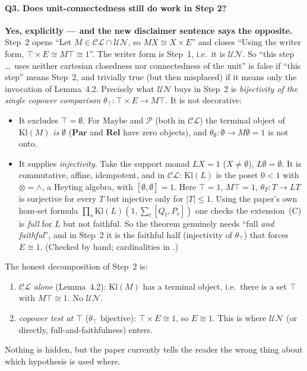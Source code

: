 \documentclass[11pt]{article}
\newcommand{\Kl}{\mathrm{Kl}}
\newcommand{\CL}{\mathcal{CL}}
\newcommand{\UN}{\mathcal{UN}}
\begin{document}
\paragraph{Q3. Does unit-connectedness still do work in Step 2?} \textbf{Yes, explicitly
--- and the new disclaimer sentence says the opposite.} Step~2 opens
``Let $M\in\CL\cap\UN$, so $MX\cong X\times E$'' and closes ``Using the writer form,
$\top\times E\cong M\top\cong1$''. The writer form is Step~1, i.e.\ it is $\UN$. So
``this step \ldots\ uses neither cartesian closedness nor connectedness of the
unit'' is false if ``this step'' means Step~2, and trivially true (but then
misplaced) if it means only the invocation of Lemma~4.2. Precisely what $\UN$
buys in Step~2 is \emph{bijectivity of the single copower comparison}
$\theta_\top:\top\times E\to M\top$. It is not decorative:
\begin{itemize}[leftmargin=*]
\item It excludes $\top=\emptyset$. For $\mathrm{Maybe}$ and $\mathcal P$ (both in $\CL$)
  the terminal object of $\Kl(M)$ \emph{is} $\emptyset$ ($\mathbf{Par}$ and $\mathbf{Rel}$
  have zero objects), and $\theta_\emptyset:\emptyset\to M\emptyset=1$ is not onto.
\item It supplies \emph{injectivity}. Take the support monad $LX=1$ ($X\ne\emptyset$),
  $L\emptyset=\emptyset$. It is commutative, affine, idempotent, and in $\CL$: $\Kl(L)$ is the
  poset $0<1$ with $\otimes=\wedge$, a Heyting algebra, with $[\emptyset,\emptyset]=1$. Here
  $\top=1$, $M\top=1$, $\theta_T:T\to LT$ is surjective for every $T$ but injective
  only for $|T|\le1$. Using the paper's own hom-set formula
  $\prod_s\Kl(L)(1,\sum_t[Q_t,P_s])$ one checks the extension~(C) is \emph{full} for
  $L$ but not faithful. So the theorem genuinely needs ``full \emph{and faithful}'',
  and in Step~2 it is the faithful half (injectivity of $\theta_\top$) that forces
  $E\cong1$. (Checked by hand; cardinalities in
  .)
\end{itemize}
The honest decomposition of Step~2 is:
\begin{enumerate}[label=(2\alph*),leftmargin=*]
\item \emph{$\CL$ alone} (Lemma~4.2): $\Kl(M)$ has a terminal object, i.e.\ there
  is a set $\top$ with $M\top\cong 1$. No $\UN$.
\item \emph{copower test at $\top$} ($\theta_\top$ bijective): $\top\times E\cong1$, so
  $E\cong1$. This is where $\UN$ (or directly, full-and-faithfulness) enters.
\end{enumerate}
Nothing is hidden, but the paper currently tells the reader the wrong thing about
which hypothesis is used where.
\end{document}
